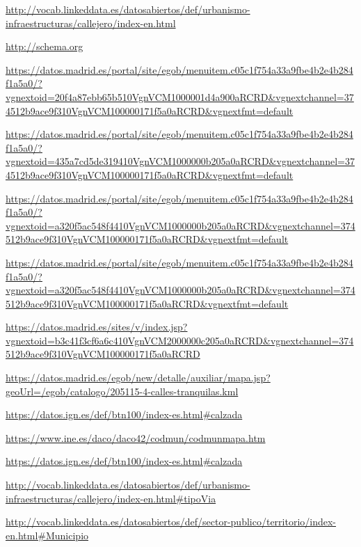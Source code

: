 \begin{thebibliography}{99}

\url{http://vocab.linkeddata.es/datosabiertos/def/urbanismo-infraestructuras/callejero/index-en.html}

\url{http://schema.org}

\url{https://datos.madrid.es/portal/site/egob/menuitem.c05c1f754a33a9fbe4b2e4b284f1a5a0/?vgnextoid=20f4a87ebb65b510VgnVCM1000001d4a900aRCRD&vgnextchannel=374512b9ace9f310VgnVCM100000171f5a0aRCRD&vgnextfmt=default}

\url{https://datos.madrid.es/portal/site/egob/menuitem.c05c1f754a33a9fbe4b2e4b284f1a5a0/?vgnextoid=435a7cd5de319410VgnVCM1000000b205a0aRCRD&vgnextchannel=374512b9ace9f310VgnVCM100000171f5a0aRCRD&vgnextfmt=default}

\url{https://datos.madrid.es/portal/site/egob/menuitem.c05c1f754a33a9fbe4b2e4b284f1a5a0/?vgnextoid=a320f5ac548f4410VgnVCM1000000b205a0aRCRD&vgnextchannel=374512b9ace9f310VgnVCM100000171f5a0aRCRD&vgnextfmt=default}



\url{https://datos.madrid.es/portal/site/egob/menuitem.c05c1f754a33a9fbe4b2e4b284f1a5a0/?vgnextoid=a320f5ac548f4410VgnVCM1000000b205a0aRCRD&vgnextchannel=374512b9ace9f310VgnVCM100000171f5a0aRCRD&vgnextfmt=default}

\url{https://datos.madrid.es/sites/v/index.jsp?vgnextoid=b3c41f3cf6a6c410VgnVCM2000000c205a0aRCRD&vgnextchannel=374512b9ace9f310VgnVCM100000171f5a0aRCRD}


\url{https://datos.madrid.es/egob/new/detalle/auxiliar/mapa.jsp?geoUrl=/egob/catalogo/205115-4-calles-tranquilas.kml}


\url{https://datos.ign.es/def/btn100/index-es.html#calzada}

\url{https://www.ine.es/daco/daco42/codmun/codmunmapa.htm}

\url{https://datos.ign.es/def/btn100/index-es.html#calzada}

\url{http://vocab.linkeddata.es/datosabiertos/def/urbanismo-infraestructuras/callejero/index-en.html#tipoVia}

\url{http://vocab.linkeddata.es/datosabiertos/def/sector-publico/territorio/index-en.html#Municipio}


\end{thebibliography}
